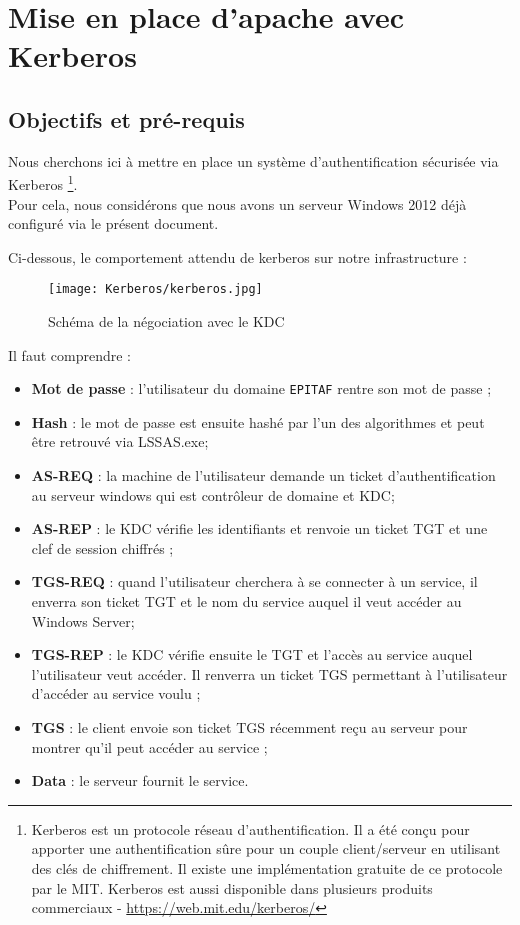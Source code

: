 \section{Mise en place d'apache avec Kerberos}
\subsection{Objectifs et pré-requis}

Nous cherchons ici à mettre en place un système d'authentification sécurisée via Kerberos \footnote{Kerberos est un protocole réseau d'authentification. Il a été conçu pour apporter une authentification sûre pour un couple client/serveur en utilisant des clés de chiffrement. Il existe une implémentation gratuite de ce protocole par le MIT. Kerberos est aussi disponible dans plusieurs produits commerciaux - \url{https://web.mit.edu/kerberos/}}. \\
Pour cela, nous considérons que nous avons un serveur Windows 2012 déjà configuré via le présent document.

Ci-dessous, le comportement attendu de kerberos sur notre infrastructure :
\begin{figure}[h!]
     \begin{center}
         \texttt{[image: Kerberos/kerberos.jpg]}
         \caption{Schéma de la négociation avec le KDC}
         \label{Debian_screenshots/Config/5}
     \end{center}
  \end{figure}
  \FloatBarrier
  \newpage
  
 Il faut comprendre :
 \begin{itemize}
    \item \textbf{Mot de passe} : l'utilisateur du domaine \texttt{EPITAF} rentre son mot de passe ;
     \item \textbf{Hash} : le mot de passe est ensuite hashé par l'un des algorithmes et peut être retrouvé via LSSAS.exe;
     \item \textbf{AS-REQ} : la machine de l'utilisateur demande un ticket d'authentification au serveur windows qui est contrôleur de domaine et KDC;
     \item \textbf{AS-REP} : le KDC vérifie les identifiants et renvoie un ticket TGT et une clef de session chiffrés ;
     \item \textbf{TGS-REQ} : quand l'utilisateur cherchera à se connecter à un service, il enverra son ticket TGT et le nom du service auquel il veut accéder au Windows Server;
     \item \textbf{TGS-REP} : le KDC vérifie ensuite le TGT et l'accès au service auquel l'utilisateur veut accéder. Il renverra un ticket TGS permettant à l'utilisateur d'accéder au service voulu ;
     \item \textbf{TGS} : le client envoie son ticket TGS récemment reçu au serveur pour montrer qu'il peut accéder au service ;
     \item \textbf{Data} : le serveur fournit le service.
 \end{itemize}

